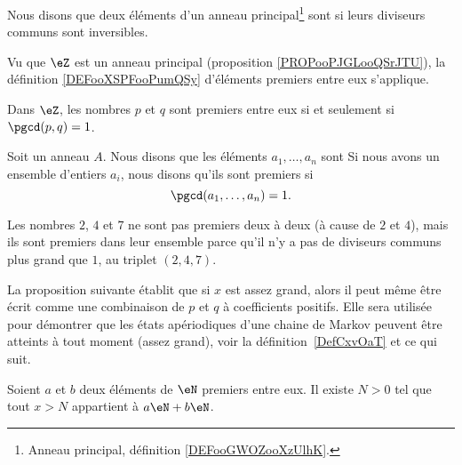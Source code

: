 \begin{definition}      \label{DEFooXSPFooPumQSy}
	Nous disons que deux éléments d'un anneau principal\footnote{Anneau principal, définition \ref{DEFooGWOZooXzUlhK}.} sont  si leurs diviseurs communs sont inversibles.
\end{definition}

Vu que \( \eZ\) est un anneau principal (proposition \ref{PROPooPJGLooQSrJTU}), la définition \ref{DEFooXSPFooPumQSy} d'éléments premiers entre eux s'applique.

\begin{lemma}       \label{LEMooLKLTooXUdsgB}
	Dans \( \eZ\), les nombres \( p\) et \( q\) sont premiers entre eux si et seulement si \( \pgcd(p,q)=1\).
\end{lemma}


\begin{definition}  \label{DefZHRXooNeWIcB}
	Soit un anneau \( A\). Nous disons que les éléments \( a_1,\ldots,a_n\) sont
	Si nous avons un ensemble d'entiers \( a_i\), nous disons qu'ils sont premiers  si
	\begin{equation}
		\pgcd(a_1,\ldots,a_n)=1.
	\end{equation}
\end{definition}

Les nombres \( 2\), \( 4\) et \( 7\) ne sont pas premiers deux à deux (à cause de \( 2\) et \( 4\)), mais ils sont premiers dans leur ensemble parce qu'il n'y a pas de diviseurs communs plus grand que \( 1\), au triplet \( (2, 4, 7)\).

La proposition suivante établit que si \( x\) est assez grand, alors il peut même être écrit comme une combinaison de \( p\) et \( q\) à coefficients positifs. Elle sera utilisée pour démontrer que les états apériodiques d'une chaine de Markov peuvent être atteints à tout moment (assez grand), voir la définition~\ref{DefCxvOaT} et ce qui suit.

\begin{proposition}     \label{PropLAbRSE}
	Soient \( a\) et \( b\) deux éléments de \( \eN\) premiers entre eux. Il existe \( N>0\) tel que tout \( x>N\) appartient à \( a\eN+b\eN\).
\end{proposition}

